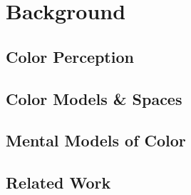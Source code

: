 
\section{Background}
\label{sec:background}

\subsection{Color Perception}

\subsection{Color Models \& Spaces}

\subsection{Mental Models of Color}

\subsection{Related Work}
